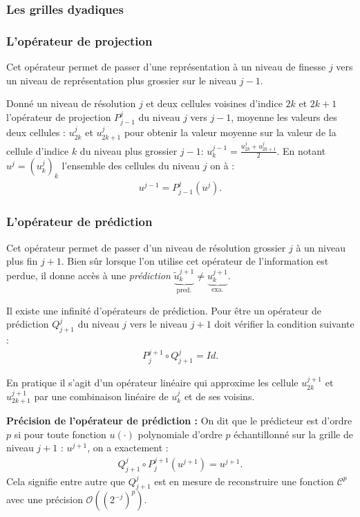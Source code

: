     \subsubsection{Les grilles dyadiques}
        
    \subsubsection{L'opérateur de projection}
        Cet opérateur permet de passer d'une représentation à un niveau de finesse $j$ vers un niveau de représentation plus grossier sur le niveau $j-1$.
        \begin{definition}
            Donné un niveau de résolution $j$ et deux cellules voisines d'indice $2k$ et $2k+1$
            l'opérateur de projection $P_{j-1}^j$ du niveau $j$ vers $j-1$, moyenne les valeurs des deux cellules : $u^j_{2k}$ et $u^j_{2k+1}$
            pour obtenir la valeur moyenne sur la valeur de la cellule d'indice $k$ du niveau plus grossier $j-1$: $u_k^{j-1} = \frac{u_{2k}^j + u_{2k+1}^j}{2}$.
            En notant $u^j = \left(u^j_k\right)_{k}$ l'ensemble des cellules du niveau $j$ on à : 
            \begin{align}u^{j-1} = P^j_{j-1} \left(u^j\right).\end{align}
        \end{definition}
    \subsubsection{L'opérateur de prédiction}
        Cet opérateur permet de passer d'un niveau de résolution grossier $j$ à un niveau plus fin $j+1$.
        Bien sûr lorsque l'on utilise cet opérateur de l’information est perdue, il donne accès à une \emph{prédiction} $\underbrace{\tilde{u}_k^{j+1}}_{\mathrm{pred.}} \neq \underbrace{u_k^{j+1}}_{\mathrm{exa.}}$.
        \begin{definition}
            Il existe une infinité d'opérateurs de prédiction.
            Pour être un opérateur de prédiction $Q_{j+1}^j$ du niveau $j$ vers le niveau $j+1$ doit vérifier la condition suivante : 
            \begin{align}
                P^{j+1}_j \circ Q_{j+1}^j = Id.
            \end{align}
        \end{definition}
        En pratique il s'agit d'un opérateur linéaire qui approxime les cellule $u^{j+1}_{2k}$ et $u^{j+1}_{2k+1}$
        par une combinaison linéaire de $u^j_k$ et de ses voisins.\par 
        \textbf{Précision de l'opérateur de prédiction : } On dit que le prédicteur est d'ordre $p$
        si pour toute fonction $u(\cdot)$ polynomiale d'ordre $p$ échantillonné sur la grille de niveau $j+1$ : $u^{j+1}$,
        on a exactement :
        \begin{align}Q^{j}_{j+1} \circ P^{j+1}_j \left(u^{j+1} \right)= u^{j+1}.\end{align}
        Cela signifie entre autre que $Q^j_{j+1}$ est en mesure de reconstruire une fonction $\mathcal{C}^p$ avec une précision $\mathcal{O}((2^{-j})^p)$.
